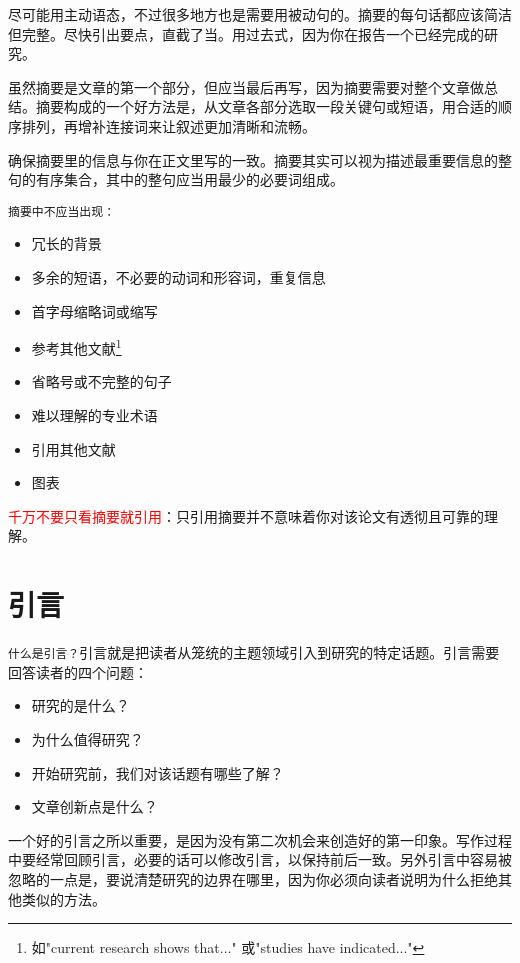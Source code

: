 \documentclass[cn,hazy,blue,14pt,screen]{elegantnote} %
\begin{document}
尽可能用主动语态，不过很多地方也是需要用被动句的。摘要的每句话都应该简洁但完整。尽快引出要点，直截了当。用过去式，因为你在报告一个已经完成的研究。

虽然摘要是文章的第一个部分，但应当最后再写，因为摘要需要对整个文章做总结。摘要构成的一个好方法是，从文章各部分选取一段关键句或短语，用合适的顺序排列，再增补连接词来让叙述更加清晰和流畅。

确保摘要里的信息与你在正文里写的一致。摘要其实可以视为描述最重要信息的整句的有序集合，其中的整句应当用最少的必要词组成。

\lstinline{摘要中不应当出现：}

\begin{itemize}
  \item 冗长的背景
  \item 多余的短语，不必要的动词和形容词，重复信息
  \item 首字母缩略词或缩写
  \item 参考其他文献\footnote{如"current research shows that..." 或"studies have indicated..."}
  \item 省略号或不完整的句子
  \item 难以理解的专业术语
  \item 引用其他文献
  \item 图表
\end{itemize}

\textcolor{red}{千万不要只看摘要就引用}：只引用摘要并不意味着你对该论文有透彻且可靠的理解。

\newpage

\section{引言}

\lstinline{什么是引言？}引言就是把读者从笼统的主题领域引入到研究的特定话题。引言需要回答读者的四个问题：

\begin{itemize}
  \item 研究的是什么？
  \item 为什么值得研究？
  \item 开始研究前，我们对该话题有哪些了解？
  \item 文章创新点是什么？
\end{itemize}

一个好的引言之所以重要，是因为没有第二次机会来创造好的第一印象。写作过程中要经常回顾引言，必要的话可以修改引言，以保持前后一致。另外引言中容易被忽略的一点是，要说清楚研究的边界在哪里，因为你必须向读者说明为什么拒绝其他类似的方法。
\end{document}
